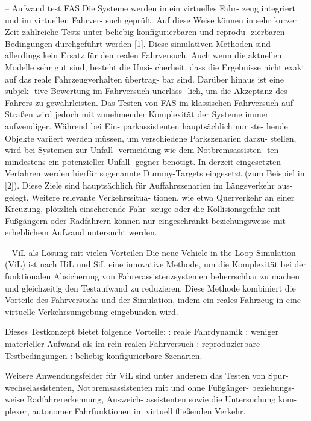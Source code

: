 -- Aufwand test FAS
Die Systeme werden in ein virtuelles Fahr- zeug integriert und im virtuellen Fahrver- such geprüft. Auf diese Weise können in sehr kurzer Zeit zahlreiche Tests unter beliebig konfigurierbaren und reprodu- zierbaren Bedingungen durchgeführt werden [1]. Diese simulativen Methoden sind allerdings kein Ersatz für den realen Fahrversuch. Auch wenn die aktuellen Modelle sehr gut sind, besteht die Unsi- cherheit, dass die Ergebnisse nicht exakt auf das reale Fahrzeugverhalten übertrag- bar sind. Darüber hinaus ist eine subjek- tive Bewertung im Fahrversuch unerläss- lich, um die Akzeptanz des Fahrers zu gewährleisten. Das Testen von FAS im klassischen Fahrversuch auf Straßen wird jedoch mit zunehmender Komplexität der Systeme immer aufwendiger. Während bei Ein- parkassistenten hauptsächlich nur ste- hende Objekte variiert werden müssen, um verschiedene Parkszenarien darzu- stellen, wird bei Systemen zur Unfall- vermeidung wie dem Notbremsassisten- ten mindestens ein potenzieller Unfall- gegner benötigt. In derzeit eingesetzten Verfahren werden hierfür sogenannte Dummy-Targets eingesetzt (zum Beispiel in [2]). Diese Ziele sind hauptsächlich für Auffahrszenarien im Längsverkehr aus- gelegt. Weitere relevante Verkehrssitua- tionen, wie etwa Querverkehr an einer Kreuzung, plötzlich einscherende Fahr- zeuge oder die Kollisionsgefahr mit Fußgängern oder Radfahrern können nur eingeschränkt beziehungsweise mit erheblichem Aufwand untersucht werden. \cite{schwab2014durchgangige}

-- ViL als Lösung mit vielen Vorteilen
Die neue Vehicle-in-the-Loop-Simulation (ViL) ist nach HiL und SiL eine innovative Methode, um die Komplexität bei der funktionalen Absicherung von Fahrerassistenzsystemen beherrschbar zu machen und gleichzeitig den Testaufwand zu reduzieren. Diese Methode kombiniert die Vorteile des Fahrversuchs und der Simulation, indem ein reales Fahrzeug in eine virtuelle Verkehrsumgebung eingebunden wird. \cite{schwab2014durchgangige}

Dieses Testkonzept bietet folgende Vorteile:
: reale Fahrdynamik
: weniger materieller Aufwand als im rein realen Fahrversuch
: reproduzierbare Testbedingungen
: beliebig konfigurierbare Szenarien. 

Weitere Anwendungsfelder für ViL sind unter anderem das Testen von Spur- wechselassistenten, Notbremsassistenten mit und ohne Fußgänger- beziehungs- weise Radfahrererkennung, Ausweich- assistenten sowie die Untersuchung kom- plexer, autonomer Fahrfunktionen im virtuell fließenden Verkehr. \cite{schwab2014durchgangige}





